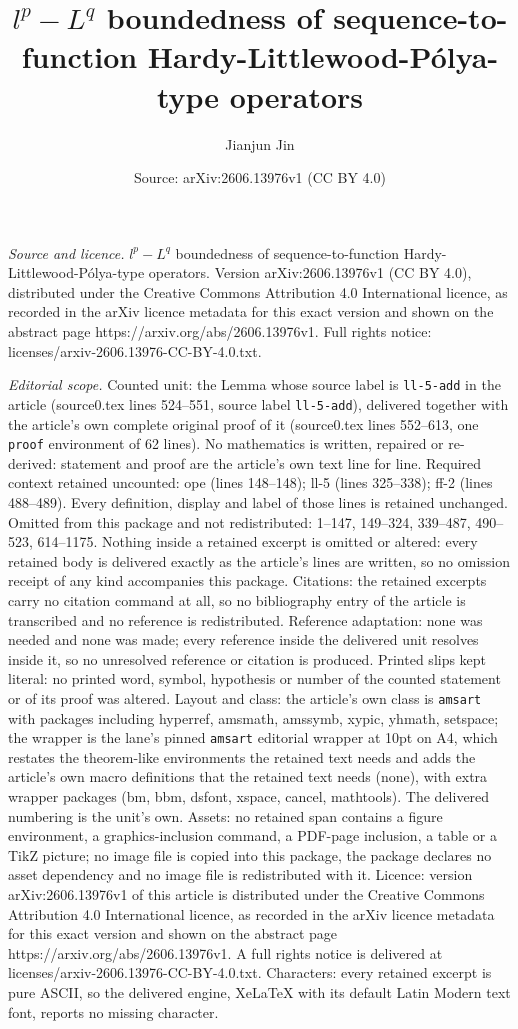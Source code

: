 \documentclass[10pt,a4paper]{amsart}
\title[$l^{p}-L^{q}$ boundedness of sequence-to-function Hardy-Litt]{$l^{p}-L^{q}$ boundedness of sequence-to-function Hardy-Littlewood-P\'{o}lya-type operators}
\author{Jianjun Jin}
\date{Source: arXiv:2606.13976v1 (CC BY 4.0)}
\begin{document}
\maketitle

\noindent\emph{Source and licence.} $l^{p}-L^{q}$ boundedness of sequence-to-function Hardy-Littlewood-P\'{o}lya-type operators. Version arXiv:2606.13976v1 (CC BY 4.0), distributed under the Creative Commons Attribution 4.0 International licence, as recorded in the arXiv licence metadata for this exact version and shown on the abstract page https://arxiv.org/abs/2606.13976v1. Full rights notice: licenses/arxiv-2606.13976-CC-BY-4.0.txt.\par\smallskip

\noindent\textit{Editorial scope.} Counted unit: the Lemma whose source label is \texttt{ll-5-add} in the article (source0.tex lines 524--551, source label \texttt{ll-5-add}), delivered together with the article's own complete original proof of it (source0.tex lines 552--613, one \texttt{proof} environment of 62 lines). No mathematics is written, repaired or re-derived: statement and proof are the article's own text line for line. Required context retained uncounted: ope (lines 148--148); ll-5 (lines 325--338); ff-2 (lines 488--489). Every definition, display and label of those lines is retained unchanged. Omitted from this package and not redistributed: 1--147, 149--324, 339--487, 490--523, 614--1175. Nothing inside a retained excerpt is omitted or altered: every retained body is delivered exactly as the article's lines are written, so no omission receipt of any kind accompanies this package. Citations: the retained excerpts carry no citation command at all, so no bibliography entry of the article is transcribed and no reference is redistributed. Reference adaptation: none was needed and none was made; every reference inside the delivered unit resolves inside it, so no unresolved reference or citation is produced. Printed slips kept literal: no printed word, symbol, hypothesis or number of the counted statement or of its proof was altered. Layout and class: the article's own class is \texttt{amsart} with packages including hyperref, amsmath, amssymb, xypic, yhmath, setspace; the wrapper is the lane's pinned \texttt{amsart} editorial wrapper at 10pt on A4, which restates the theorem-like environments the retained text needs and adds the article's own macro definitions that the retained text needs (none), with extra wrapper packages (bm, bbm, dsfont, xspace, cancel, mathtools). The delivered numbering is the unit's own. Assets: no retained span contains a figure environment, a graphics-inclusion command, a PDF-page inclusion, a table or a TikZ picture; no image file is copied into this package, the package declares no asset dependency and no image file is redistributed with it. Licence: version arXiv:2606.13976v1 of this article is distributed under the Creative Commons Attribution 4.0 International licence, as recorded in the arXiv licence metadata for this exact version and shown on the abstract page https://arxiv.org/abs/2606.13976v1. A full rights notice is delivered at licenses/arxiv-2606.13976-CC-BY-4.0.txt. Characters: every retained excerpt is pure ASCII, so the delivered engine, XeLaTeX with its default Latin Modern text font, reports no missing character.
\end{document}

